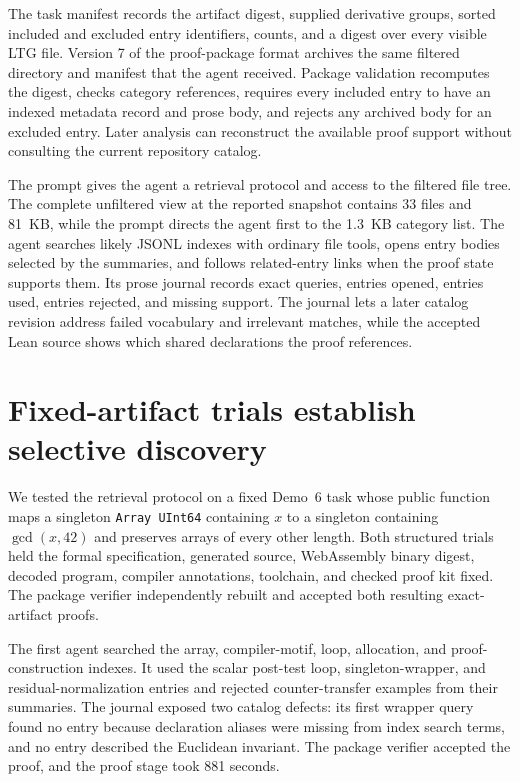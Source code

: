 \documentclass[10pt]{article}
\begin{document}
The task manifest records the artifact digest, supplied derivative groups, sorted included and excluded entry identifiers, counts, and a digest over every visible LTG file.  Version 7 of the proof-package format archives the same filtered directory and manifest that the agent received.  Package validation recomputes the digest, checks category references, requires every included entry to have an indexed metadata record and prose body, and rejects any archived body for an excluded entry.  Later analysis can reconstruct the available proof support without consulting the current repository catalog.

The prompt gives the agent a retrieval protocol and access to the filtered file tree.  The complete unfiltered view at the reported snapshot contains 33 files and 81~KB, while the prompt directs the agent first to the 1.3~KB category list.  The agent searches likely JSONL indexes with ordinary file tools, opens entry bodies selected by the summaries, and follows related-entry links when the proof state supports them.  Its prose journal records exact queries, entries opened, entries used, entries rejected, and missing support.  The journal lets a later catalog revision address failed vocabulary and irrelevant matches, while the accepted Lean source shows which shared declarations the proof references.

\section{Fixed-artifact trials establish selective discovery}

We tested the retrieval protocol on a fixed Demo~6 task whose public function maps a singleton \texttt{Array UInt64} containing $x$ to a singleton containing $\gcd(x,42)$ and preserves arrays of every other length.  Both structured trials held the formal specification, generated source, WebAssembly binary digest, decoded program, compiler annotations, toolchain, and checked proof kit fixed.  The package verifier independently rebuilt and accepted both resulting exact-artifact proofs.

The first agent searched the array, compiler-motif, loop, allocation, and proof-construction indexes.  It used the scalar post-test loop, singleton-wrapper, and residual-normalization entries and rejected counter-transfer examples from their summaries.  The journal exposed two catalog defects: its first wrapper query found no entry because declaration aliases were missing from index search terms, and no entry described the Euclidean invariant.  The package verifier accepted the proof, and the proof stage took 881 seconds.
\end{document}
